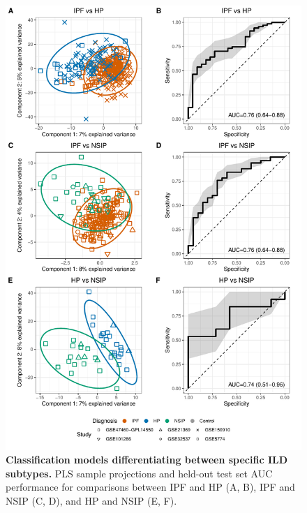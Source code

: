 \documentclass[
]{article}
\begin{document}
\begin{figure}

{\centering \includegraphics[width=0.8\linewidth,]{./Figures/SysReview/FigE6_ILDvsILD} 

}

\caption[ILD subtype vs. subtype classification models]{\textbf{Classification models differentiating between specific ILD subtypes.} PLS sample projections and held-out test set AUC performance for comparisons between IPF and HP (A, B), IPF and NSIP (C, D), and HP and NSIP (E, F).}\label{fig:ildvsildspecific}
\end{figure}

\newpage
\end{document}
